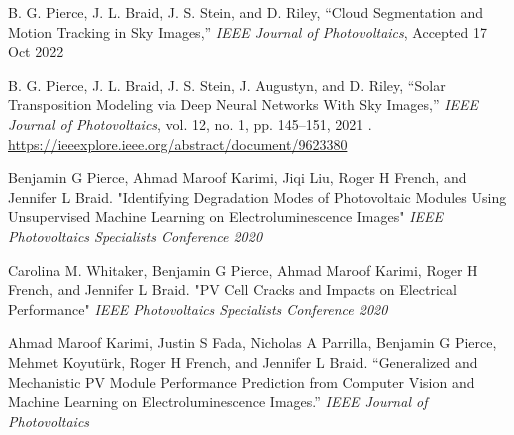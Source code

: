 \documentclass[10pt]{article}
\begin{document}
		

	{\begin{newitemize}
    
        \item{{ B. G. Pierce}, J. L. Braid, J. S. Stein, and D. Riley, “Cloud Segmentation and Motion Tracking in Sky Images,” \textit{IEEE Journal of Photovoltaics}, Accepted 17 Oct 2022
                }
                
        \item{{ B. G. Pierce}, J. L. Braid, J. S. Stein, J. Augustyn, and D. Riley, “Solar Transposition Modeling via Deep Neural Networks With Sky Images,” \textit{IEEE Journal of Photovoltaics}, vol. 12, no. 1, pp. 145–151, 2021 . \href{https://ieeexplore.ieee.org/abstract/document/9623380}{https://ieeexplore.ieee.org/abstract/document/9623380}
        }
		\item{{ Benjamin G Pierce}, Ahmad Maroof Karimi, Jiqi Liu, Roger H French, and Jennifer L Braid. "Identifying Degradation Modes  of Photovoltaic Modules Using Unsupervised Machine Learning on Electroluminescence Images" \textit{IEEE Photovoltaics Specialists Conference 2020}}
		\item{Carolina M. Whitaker, { Benjamin G Pierce}, Ahmad Maroof Karimi, Roger H French, and Jennifer L Braid. "PV Cell Cracks and Impacts on Electrical Performance" \textit{IEEE Photovoltaics Specialists Conference 2020}}
		\item{Ahmad Maroof Karimi, Justin S Fada, Nicholas A Parrilla, { Benjamin G Pierce}, Mehmet Koyutürk, Roger H French, and Jennifer L Braid. “Generalized and Mechanistic PV Module Performance Prediction from Computer Vision and Machine Learning on Electroluminescence Images.” \textit{IEEE Journal of Photovoltaics} }

\end{newitemize}}
\end{document}
